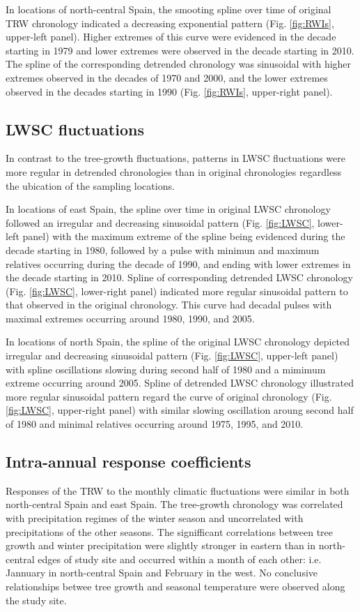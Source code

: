 \documentclass[review,authoryear]{elsarticle}
\begin{document}
In locations of north-central Spain, the smooting spline over time of
original \gls{TRW} chronology indicated a decreasing exponential
pattern (Fig. \ref{fig:RWIs}, upper-left panel). Higher extremes of
this curve were evidenced in the decade starting in 1979 and lower
extremes were observed in the decade starting in 2010. The spline of
the corresponding detrended chronology was sinusoidal with higher
extremes observed in the decades of 1970 and 2000, and the lower
extremes observed in the decades starting in 1990
(Fig. \ref{fig:RWIs}, upper-right panel).

\subsection{\acrlong{LWSC} fluctuations}
In contrast to the tree-growth fluctuations, patterns in \acrfull{LWSC}
fluctuations were more regular in detrended chronologies than in
original chronologies regardless the ubication of the sampling
locations.

In locations of east Spain, the spline over time in original
\gls{LWSC} chronology followed an irregular and decreasing sinusoidal
pattern (Fig. \ref{fig:LWSC}, lower-left panel) with the maximum
extreme of the spline being evidenced during the decade starting in
1980, followed by a pulse with minimun and maximum relatives occurring
during the decade of 1990, and ending with lower extremes in the
decade starting in 2010.  Spline of corresponding detrended \gls{LWSC}
chronology (Fig. \ref{fig:LWSC}, lower-right panel) indicated more
regular sinusoidal pattern to that observed in the original
chronology. This curve had decadal pulses with maximal extremes
occurring around 1980, 1990, and 2005.

In locations of north Spain, the spline of the original \gls{LWSC}
chronology depicted irregular and decreasing sinusoidal pattern
(Fig. \ref{fig:LWSC}, upper-left panel) with spline oscillations
slowing during second half of 1980 and a mimimum extreme occurring
around 2005. Spline of detrended \gls{LWSC} chronology illustrated
more regular sinusoidal pattern regard the curve of original
chronology (Fig. \ref{fig:LWSC}, upper-right panel) with similar
slowing oscillation aroung second half of 1980 and minimal relatives
occurring around 1975, 1995, and 2010.

\subsection{Intra-annual response coefficients}
Responses of the \gls{TRW} to the monthly climatic fluctuations were
similar in both north-central Spain and east Spain. The tree-growth
chronology was correlated with precipitation regimes of the winter
season and uncorrelated with precipitations of the other seasons. The
signifficant correlations between tree growth and winter precipitation
were slightly stronger in eastern than in north-central edges of study
site and occurred within a month of each other: i.e. Jannuary in
north-central Spain and February in the west. No conclusive
relationships betwee tree growth and seasonal temperature were
observed along the study site.
\end{document}
